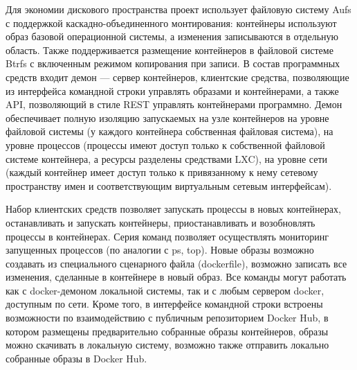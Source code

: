 Для экономии дискового пространства проект использует файловую систему Aufs с поддержкой каскадно-объединенного монтирования: контейнеры используют образ базовой операционной системы, а изменения записываются в отдельную область.
Также поддерживается размещение контейнеров в файловой системе Btrfs с включенным режимом копирования при записи.
В состав программных средств входит демон --- сервер контейнеров, клиентские средства, позволяющие из интерфейса командной строки управлять образами и контейнерами, а также API, позволяющий в стиле REST управлять контейнерами программно.
Демон обеспечивает полную изоляцию запускаемых на узле контейнеров на уровне файловой системы (у каждого контейнера собственная файловая система), на уровне процессов (процессы имеют доступ только к собственной файловой системе контейнера, а ресурсы разделены средствами LXC), на уровне сети (каждый контейнер имеет доступ только к привязанному к нему сетевому пространству имен и соответствующим виртуальным сетевым интерфейсам).

Набор клиентских средств позволяет запускать процессы в новых контейнерах, останавливать и запускать контейнеры, приостанавливать и возобновлять процессы в контейнерах.
Серия команд позволяет осуществлять мониторинг запущенных процессов (по аналогии с ps, top).
Новые образы возможно создавать из специального сценарного файла (dockerfile), возможно записать все изменения, сделанные в контейнере в новый образ.
Все команды могут работать как с docker-демоном локальной системы, так и с любым сервером docker, доступным по сети.
Кроме того, в интерфейсе командной строки встроены возможности по взаимодействию с публичным репозиторием Docker Hub, в котором размещены предварительно собранные образы контейнеров, образы можно скачивать в локальную систему, возможно также отправить локально собранные образы в Docker Hub.

\clearpage
